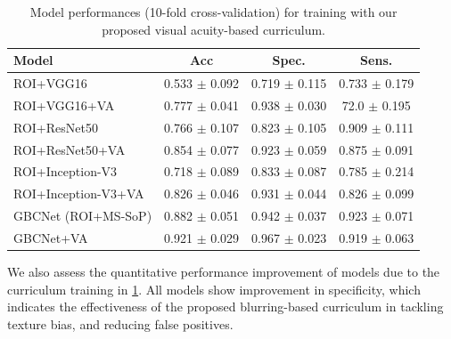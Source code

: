 \begin{table}[t]
	\centering
	\footnotesize
    \begin{tabular}{@{}lccc@{}}
    \toprule[1pt]
    \textbf{Model} & \textbf{Acc} & \textbf{Spec.} & \textbf{Sens.} \\
    \midrule[0.5pt]
    ROI+VGG16 & 0.533 $\pm$ 0.092 & 0.719 $\pm$ 0.115 & 0.733 $\pm$ 0.179\\
    ROI+VGG16+VA & 0.777 $\pm$ 0.041 & 0.938 $\pm$ 0.030 & 72.0 $\pm$ 0.195\\
    \midrule
    ROI+ResNet50 & 0.766 $\pm$ 0.107 &  0.823 $\pm$ 0.105 & 0.909 $\pm$ 0.111\\
    ROI+ResNet50+VA & 0.854 $\pm$ 0.077 & 0.923 $\pm$ 0.059 & 0.875 $\pm$ 0.091 \\
    \midrule
    ROI+Inception-V3 & 0.718 $\pm$ 0.089 & 0.833 $\pm$ 0.087 & 0.785 $\pm$ 0.214\\
    ROI+Inception-V3+VA & 0.826 $\pm$ 0.046 & 0.931 $\pm$ 0.044 & 0.826 $\pm$ 0.099\\
    \midrule
    GBCNet (ROI+MS-SoP) & 0.882 $\pm$ 0.051 & 0.942 $\pm$ 0.037 & 0.923 $\pm$ 0.071\\
    GBCNet+VA & 0.921 $\pm$ 0.029 &  0.967 $\pm$ 0.023 & 0.919 $\pm$ 0.063\\
    \bottomrule[1pt]
    \end{tabular}
	\caption[Model performances for training with visual acuity curriculum]{Model performances (10-fold cross-validation) for training with our proposed visual acuity-based curriculum.}
\label{tbl:curr_improve}
\end{table}

We also assess the quantitative performance improvement of models due to the curriculum training in \cref{tbl:curr_improve}. All models show improvement in specificity, which indicates the effectiveness of the proposed blurring-based curriculum in tackling texture bias, and reducing false positives. 

